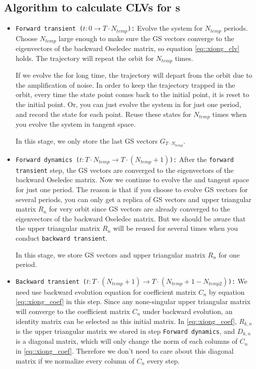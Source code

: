 \subsection{Algorithm to calculate CLVs for \po s}

    \begin{itemize}
     \item \texttt{Forward transient ($ t:0\to T \cdot N_{temp}$):}
     Evolve the system for $N_{temp}$ periods. Choose $N_{temp}$ large enough to make
     sure the GS vectors converge to the eigenvectors of
     the backward Oseledec matrix, so equation
     \eqref{eq::xiong_clv} holds. The trajectory will repeat the orbit for $N_{temp}$
     times.

     If we evolve the {\statesp} for long time, the trajectory will depart from the
     orbit due to the amplification of noise.
     In order to keep the trajectory trapped in the orbit, every time the state point
     comes back to the initial point, it is reset to the initial point. Or, you can
     just evolve the system in {\statesp} for just one period, and record the state
     for each point. Reuse these states for $N_{temp}$ times when you evolve the system
     in tangent space.

     In this stage, we only store the last GS vectors $G_{T \cdot N_{temp}}$.

     \item \texttt{Forward dynamics ($t:T \cdot N_{temp}\to T \cdot (N_{temp}+1)$):}
     After the \texttt{forward transient} step, the GS vectors are converged to the
     eigenvectors of the
     backward Oseledec matrix. Now we continue to evolve the {\statesp} and tangent
     space for just one period. The reason is that if you choose to evolve GS vectors
     for several periods,
     you can only get a replica of GS vectors and upper triangular matrix $R_{n}$ for
     very orbit since GS vectors are already converged to the eigenvectors of the
     backward Oseledec matrix. But we should be aware that the upper triangular matrix
     $R_{n}$ will be reused for several times when you conduct \texttt{backward transient}.

     In this stage, we store GS vectors and upper triangular matrix
     $R_{n}$ for one period.

      \item \texttt{Backward transient ($t:T \cdot (N_{temp}+1)\to T \cdot (N_{temp}+1-N_{temp2})$):}
      We need use backward evolution equation for coefficient matrix $C_{n}$ by equation
      \eqref{eq::xiong_coef} in this step.  Since any none-singular upper
      triangular matrix will converge to the coefficient matrix $C_n$ under
      backward evolution, an identity matrix can be selected as this initial
      matrix. In \eqref{eq::xiong_coef}, $R_{k,n}$ is the upper triangular
      matrix we stored in step \texttt{Forward dynamics}, and $D_{k,n}$ is a diagonal
      matrix, which will only change the norm of each columns of $C_{n}$ in
      \eqref{eq::xiong_coef}. Therefore we don't need to care about this diagonal matrix
      if we normalize every column of $C_{n}$ every step.


\end{itemize}
